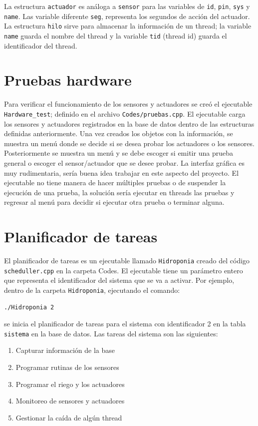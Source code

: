 \documentclass[10pt,twocolumn]{article}
\begin{document}
La estructura \verb|actuador| 
es an\'aloga a \verb|sensor| para las variables de \verb|id|, \verb|pin|, \verb|sys| y \verb|name|. Las variable diferente \verb|seg|, representa los segundos de acci\'on 
del actuador. La estructura \verb|hilo| sirve para almacenar la informaci\'on de un thread; la variable \verb|name| guarda el nombre del thread y la variable \verb|tid| 
(thread id) guarda el identificador del thread.

\section{Pruebas hardware}
Para verificar el funcionamiento de los sensores y actuadores se cre\'o el ejecutable \verb|Hardware_test|; definido en el archivo \verb|Codes/pruebas.cpp|. El ejecutable 
carga 
los sensores y actuadores registrados en la base de datos dentro de las estructuras definidas anteriormente. Una vez creados los objetos con la informaci\'on, se muestra un 
men\'u donde se decide si se desea probar los actuadores o los sensores. 
Posteriormente se muestra un men\'u y se debe escoger si emitir una prueba general o escoger el sensor/actuador que se desee probar. La interfaz gr\'afica es muy 
rudimentaria, ser\'ia buena idea trabajar en este aspecto del proyecto. El ejecutable no tiene manera de hacer m\'ultiples pruebas o de suspender la ejecuci\'on de una 
prueba, la soluci\'on ser\'ia ejecutar en threads las pruebas y 
regresar al men\'u para decidir si ejecutar otra prueba o terminar alguna.

\section{Planificador de tareas}
El planificador de tareas es un ejecutable llamado \verb|Hidroponia| creado del c\'odigo \verb|scheduller.cpp| en la carpeta Codes. El ejecutable tiene un par\'ametro 
entero que representa el identificador del sistema que se va a activar. Por ejemplo, dentro de la carpeta \verb|Hidroponia|, ejecutando el comando:

\begin{verbatim}
./Hidroponia 2
\end{verbatim}

se inicia el planificador de tareas para el sistema con identificador 2 en la tabla \verb|sistema| en la base de datos. Las tareas del sistema son las siguientes:

\begin{enumerate}  
	\item Capturar informaci\'on de la base 
	\item Programar rutinas de los sensores
	\item Programar el riego y los actuadores
	\item Monitoreo de sensores y actuadores
	\item Gestionar la ca\'ida de alg\'un thread
\end{enumerate}
\end{document}
